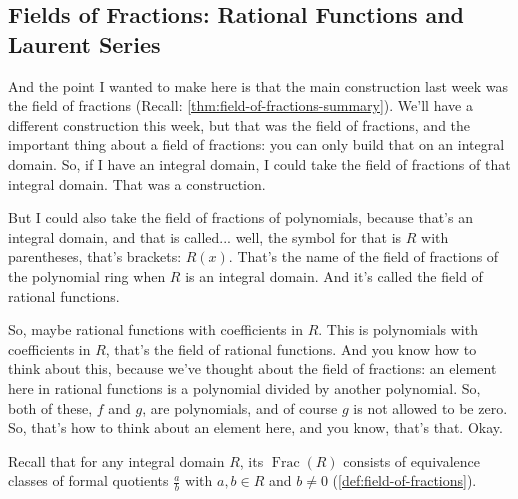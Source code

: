 \subsection{Fields of Fractions: Rational Functions and Laurent Series}

\begin{speech}[00:07:07 - 00:08:35]
And the point I wanted to make here is that the main construction last week was the field of fractions (Recall: \cref{thm:field-of-fractions-summary}).  We'll have a different construction this week, but that was the field of fractions, and the important thing about a field of fractions: you can only build that on an integral domain. So, if I have an integral domain, I could take the field of fractions of that integral domain. That was a construction. 

But I could also take the field of fractions of polynomials, because that's an integral domain, and that is called... well, the symbol for that is $R$ with parentheses, that's brackets:  $R(x)$. That's the name of the field of fractions of the polynomial ring when $R$ is an integral domain. And it's called the field of rational functions. 

So, maybe rational functions with coefficients in $R$. This is polynomials with coefficients in $R$, that's the field of rational functions. And you know how to think about this, because we've thought about the field of fractions: an element here in rational functions is a polynomial divided by another polynomial. So, both of these, $f$ and $g$, are polynomials, and of course $g$ is not allowed to be zero.  So, that's how to think about an element here, and you know, that's that. Okay.
\end{speech}

\begin{content}
Recall that for any integral domain $R$, its  $\operatorname{Frac}(R)$ consists of equivalence classes of formal quotients $\frac{a}{b}$ with $a, b \in R$ and $b \neq 0$ (\cref{def:field-of-fractions}).

\end{content}

